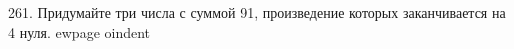261. Придумайте три числа с суммой 91, произведение которых заканчивается на 4 нуля.
ewpage
oindent
